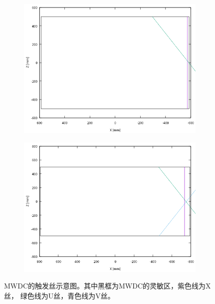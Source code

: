 \documentclass[bachelor,openany,oneside,color]{buaathesis}
\begin{document}
\begin{figure}
	\centering
	\begin{subfigure}[c]{0.4\linewidth}
		\includegraphics[width=\textwidth]{./resource/MWDC2-result.png}
		\label{fig:result:MWDC2}
	\end{subfigure}
	\begin{subfigure}[c]{0.4\linewidth}
		\includegraphics[width=\textwidth]{./resource/MWDC3-result.png}
		\label{fig:result:MWDC3}
	\end{subfigure}
	\caption{MWDC的触发丝示意图。其中黑框为MWDC的灵敏区，紫色线为X丝，
		绿色线为U丝，青色线为V丝。}
	\label{fig:result:MWDC}
\end{figure}
\end{document}

